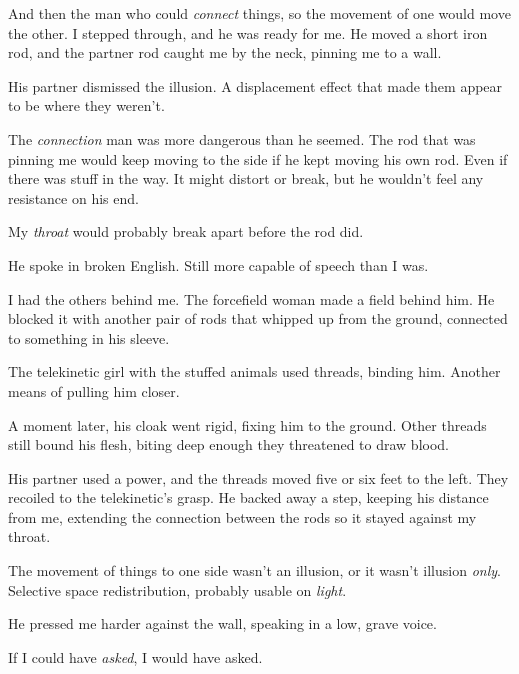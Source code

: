 And then the man who could \emph{connect} things, so the movement of one would move the other.  I stepped through, and he was ready for me.  He moved a short iron rod, and the partner rod caught me by the neck, pinning me to a wall.



His partner dismissed the illusion.  A displacement effect that made them appear to be where they weren't.



The \emph{connection} man was more dangerous than he seemed.  The rod that was pinning me would keep moving to the side if he kept moving his own rod.  Even if there was stuff in the way.  It might distort or break, but he wouldn't feel any resistance on his end.



My \emph{throat} would probably break apart before the rod did.



He spoke in broken English.  Still more capable of speech than I was.



I had the others behind me.  The forcefield woman made a field behind him.  He blocked it with another pair of rods that whipped up from the ground, connected to something in his sleeve.



The telekinetic girl with the stuffed animals used threads, binding him.  Another means of pulling him closer.



A moment later, his cloak went rigid, fixing him to the ground.  Other threads still bound his flesh, biting deep enough they threatened to draw blood.



His partner used a power, and the threads moved five or six feet to the left.  They recoiled to the telekinetic's grasp.  He backed away a step, keeping his distance from me, extending the connection between the rods so it stayed against my throat.



The movement of things to one side wasn't an illusion, or it wasn't illusion \emph{only}.  Selective space redistribution, probably usable on \emph{light}.



He pressed me harder against the wall, speaking in a low, grave voice.



If I could have \emph{asked}, I would have asked.



